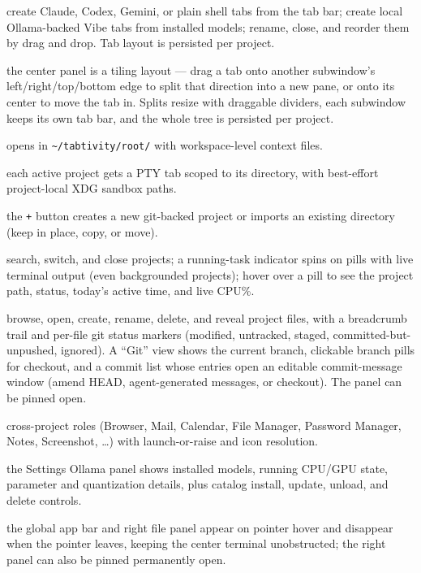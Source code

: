 \documentclass[11pt,a4paper]{article}
\newcommand{\code}[1]{\texttt{#1}}
\begin{document}
\begin{description}[leftmargin=1.2em,style=nextline]
  \item[Agent-terminal orchestration] create Claude, Codex, Gemini, or plain
  shell tabs from the tab bar; create local Ollama-backed Vibe tabs from
  installed models; rename, close, and reorder them by drag and drop. Tab layout
  is persisted per project.
  \item[Tiling subwindows] the center panel is a tiling layout --- drag a tab
  onto another subwindow's left/right/top/bottom edge to split that direction
  into a new pane, or onto its center to move the tab in. Splits resize with
  draggable dividers, each subwindow keeps its own tab bar, and the whole tree
  is persisted per project.
  \item[Root control terminal] opens in \code{\textasciitilde/tabtivity/root/} with
  workspace-level context files.
  \item[Project terminals] each active project gets a PTY tab scoped to its
  directory, with best-effort project-local XDG sandbox paths.
  \item[Project creation and import] the \code{+} button creates a new
  git-backed project or imports an existing directory (keep in place, copy, or
  move).
  \item[Project switcher] search, switch, and close projects; a running-task
  indicator spins on pills with live terminal output (even backgrounded
  projects); hover over a pill to see the project path, status, today's active
  time, and live CPU\%.
  \item[Right file panel] browse, open, create, rename, delete, and reveal
  project files, with a breadcrumb trail and per-file git status markers
  (modified, untracked, staged, committed-but-unpushed, ignored). A ``Git'' view
  shows the current branch, clickable branch pills for checkout, and a commit
  list whose entries open an editable commit-message window (amend HEAD,
  agent-generated messages, or checkout). The panel can be pinned open.
  \item[Global app toolbar] cross-project roles (Browser, Mail, Calendar, File
  Manager, Password Manager, Notes, Screenshot, \dots) with launch-or-raise and
  icon resolution.
  \item[Ollama model management] the Settings Ollama panel shows installed
  models, running CPU/GPU state, parameter and quantization details, plus
  catalog install, update, unload, and delete controls.
  \item[Hover-revealed panels] the global app bar and right file panel appear on
  pointer hover and disappear when the pointer leaves, keeping the center
  terminal unobstructed; the right panel can also be pinned permanently open.
\end{description}
\end{document}
